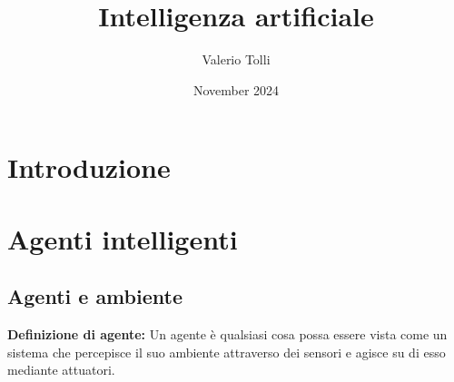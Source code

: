 \documentclass{article}
\title{Intelligenza artificiale}
\author{Valerio Tolli}
\date{November 2024}
\begin{document}
\maketitle
\newpage
\tableofcontents

\newpage
\section{Introduzione}

\newpage
\section{Agenti intelligenti}
\subsection{Agenti e ambiente}
\textbf{Definizione di agente:} Un agente è qualsiasi cosa possa essere vista come un sistema che percepisce il suo ambiente attraverso dei sensori e agisce su di esso mediante attuatori.\newline
\end{document}
